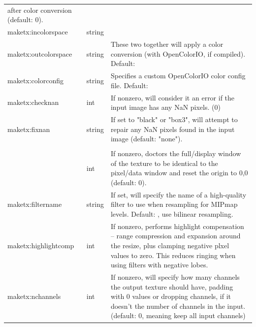 \begin{longtable}{ >{\spc \cf\small}p{1.8in} >{\cf\small}l p{3in}}
                             after color conversion (default: 0). \\
   {\small maketx:incolorspace} & string & \\
   {\small maketx:outcolorspace} & string &
                          These two together will apply a color conversion
                              (with OpenColorIO, if compiled). Default: \qkw{} \\
   {\small maketx:colorconfig} & string &
                          Specifies a custom OpenColorIO color config file.
                              Default: \qkw{} \\
   maketx:checknan & int &   If nonzero, will consider it an error if the
                              input image has any NaN pixels. (0) \\
   maketx:fixnan & string & If set to "black" or "box3", will attempt
                              to repair any NaN pixels found in the
                              input image (default: "none"). \\
   \multicolumn{2}{l}{\spc \cf\small maketx:set_full_to_pixels} \\ & int &
                          If nonzero, doctors the full/display window
                              of the texture to be identical to the
                              pixel/data window and reset the origin
                              to 0,0 (default: 0). \\
   maketx:filtername & string &
                          If set, will specify the name of a high-quality
                             filter to use when resampling for MIPmap
                             levels. Default: \qkw{}, use bilinear resampling. \\
   maketx:highlightcomp & int &
                          If nonzero, performs highlight compensation --
                             range compression and expansion around 
                             the resize, plus clamping negative plxel
                             values to zero. This reduces ringing when
                             using filters with negative lobes. \\
   maketx:nchannels & int &  If nonzero, will specify how many channels
                             the output texture should have, padding with
                             0 values or dropping channels, if it doesn't
                             the number of channels in the input.
                             (default: 0, meaning keep all input channels) \\

\end{longtable}
